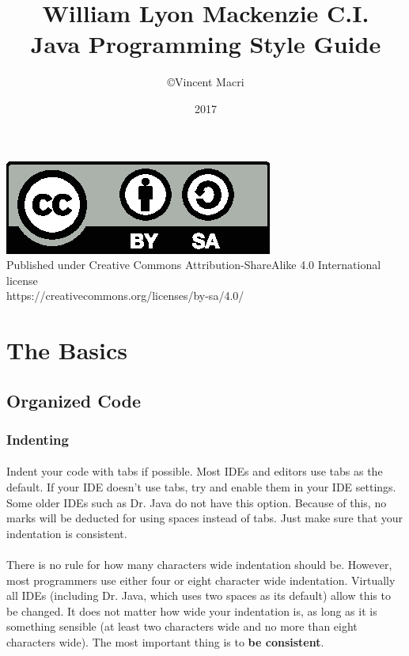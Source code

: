 \documentclass[12pt, letterpaper]{article}
\title{William Lyon Mackenzie C.I.\\Java Programming Style Guide}
\author{\copyright Vincent Macri}
\date{2017}
\begin{document}
	\maketitle
	\begin{center}
		\includegraphics{by-sa}
		\\
		Published under Creative Commons Attribution-ShareAlike 4.0 International license
		\\
		https://creativecommons.org/licenses/by-sa/4.0/
	\end{center}
	\tableofcontents
	\newpage
	
	\section{The Basics}
		\subsection{Organized Code}
			\subsubsection{Indenting}
				\paragraph{}
					Indent your code with tabs if possible. Most IDEs and editors use tabs as the default. If your IDE doesn't use tabs, try and enable them in your IDE settings. Some older IDEs such as Dr. Java do not have this option. Because of this, no marks will be deducted for using spaces instead of tabs. Just make sure that your indentation is consistent.
				\paragraph{}
					There is no rule for how many characters wide indentation should be. However, most programmers use either four or eight character wide indentation. Virtually all IDEs (including Dr. Java, which uses two spaces as its default) allow this to be changed. It does not matter how wide your indentation is, as long as it is something sensible (at least two characters wide and no more than eight characters wide). The most important thing is to \textbf{be consistent}.
\end{document}

